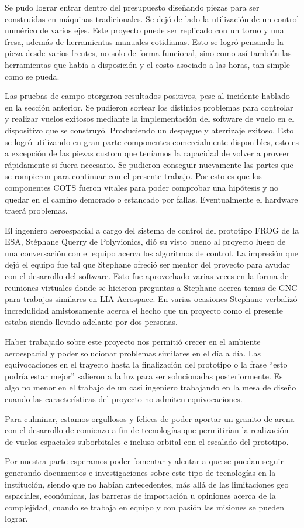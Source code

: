 Se pudo lograr entrar dentro del presupuesto diseñando piezas para ser construidas en máquinas tradicionales. Se dejó de lado la utilización de un control numérico de varios ejes. Este proyecto puede ser replicado con un torno y una fresa, además de herramientas manuales cotidianas. Esto se logró pensando la pieza desde varios frentes, no solo de forma funcional, sino como así también las herramientas que había a disposición y el costo asociado a las horas, tan simple como se pueda.

Las pruebas de campo otorgaron resultados positivos, pese al incidente hablado en la sección anterior. Se pudieron sortear los distintos problemas para controlar y realizar vuelos exitosos mediante la implementación del software de vuelo en el dispositivo que se construyó. Produciendo un despegue y aterrizaje exitoso. Esto se logró utilizando en gran parte componentes comercialmente disponibles, esto es a excepción de las piezas custom que teníamos la capacidad de volver a proveer rápidamente si fuera necesario. Se pudieron conseguir nuevamente las partes
que se rompieron para continuar con el presente trabajo. Por esto es que los componentes COTS fueron vitales para poder comprobar una hipótesis y no quedar en el camino demorado o estancado por fallas. Eventualmente el hardware traerá problemas.

El ingeniero aeroespacial a cargo del sistema de control del prototipo FROG de la ESA, Stéphane Querry de Polyvionics, dió su visto bueno al proyecto luego de una conversación con el equipo acerca los algoritmos de control. La impresión que dejó el equipo fue tal que Stephane ofreció ser mentor del proyecto para ayudar con el desarrollo del software. Esto fue aprovechado varias veces en la forma de reuniones virtuales donde se hicieron preguntas a Stephane acerca temas de GNC para trabajos similares en LIA Aerospace. En varias ocasiones Stephane verbalizó incredulidad amistosamente acerca el hecho que un proyecto como el presente estaba siendo llevado adelante por dos personas.

\medskip

Haber trabajado sobre este proyecto nos permitió crecer en el ambiente aeroespacial y poder solucionar problemas similares en el día a día. Las equivocaciones en el trayecto hasta la finalización del prototipo o la frase “esto podría estar mejor” salieron a la luz para ser solucionadas posteriormente. Es algo no menor en el trabajo de un casi ingeniero trabajando en la mesa de diseño cuando las características del proyecto no admiten equivocaciones.

Para culminar, estamos orgullosos y felices de poder aportar un granito de arena con el desarrollo de comienzo a fin de tecnologías que permitirían la realización de vuelos espaciales suborbitales e incluso orbital con el escalado del prototipo.

Por nuestra parte esperamos poder fomentar y alentar a que se puedan seguir generando documentos e investigaciones sobre este tipo de tecnologías en la institución, siendo que no habían antecedentes, más allá de las limitaciones geo espaciales, económicas, las barreras de importación u opiniones acerca de la complejidad, cuando se trabaja en equipo y con pasión las misiones se pueden lograr.
